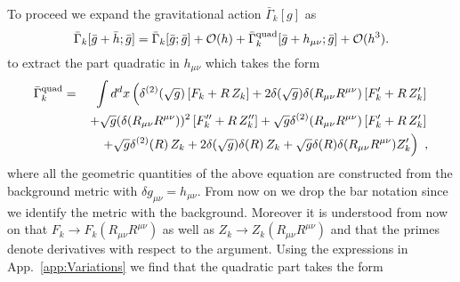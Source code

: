 \documentclass[notitlepage,eqsecnum,bm,amsmath,preprintnumbers,superscriptaddress,nofootinbib,aps,11pt]{revtex4-1}
\begin{document}
To proceed we expand the
 gravitational action $\bar\Gamma_k[g]$ as
\begin{equation}
\bar\Gamma_k[\bar g+\bar h;\bar g]=\bar \Gamma_k[\bar g; \bar g]+ \mathcal{O}(h)+\bar \Gamma_k^{\rm{quad}}[\bar g + h_{\mu\nu} ;\bar g]+\mathcal{O}(h^3).
\end{equation} 
to extract the part quadratic in $h_{\mu\nu}$ which takes the form 
\begin{eqnarray}
\bar\Gamma^{\rm{quad}}_k&=&\int d^d x\left(\delta^{(2)}(\sqrt{g})\left[F_k+R\,Z_k\right]+2\delta(\sqrt{g})\delta(R_{\mu\nu}R^{\mu\nu})\left[F_k'+R\,Z_k'\right]\right.\nonumber\\
&&\left.+\sqrt{g}(\delta(R_{\mu\nu}R^{\mu\nu}))^2\left[F_k''+R\,Z_k''\right]+\sqrt{g}\delta^{(2)}(R_{\mu\nu}R^{\mu\nu})\left[F_k'+R\,Z_k'\right]\right.\nonumber\\
&&\left.+\sqrt{g}\delta^{(2)}(R)\,Z_k+2\delta(\sqrt{g})\delta(R)\,Z_k+\sqrt{g}\delta(R)\delta(R_{\mu\nu}R^{\mu\nu})Z_k'\right)\ ,\label{QuadraticPartFR}
\end{eqnarray}
where all the geometric quantities of the above equation are constructed from the background metric with $\delta g_{\mu\nu} = h_{\mu\nu}$. From now on we drop the bar notation since we identify the metric with the background. Moreover it is understood from now on that $F_k\to F_k(R_{\mu\nu}R^{\mu\nu})$ as well as $Z_k\to Z_k(R_{\mu\nu}R^{\mu\nu})$ and that the primes denote derivatives with respect to the argument. Using the expressions in App.~\ref{app:Variations} we find that the quadratic part takes the form
\end{document}
